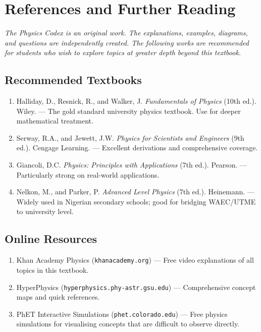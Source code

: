 
\chapter*{References and Further Reading}

{\small\itshape
The Physics Codex is an original work. The explanations,
examples, diagrams, and questions are independently created.
The following works are recommended for students who wish to
explore topics at greater depth beyond this textbook.
}

\vspace{0.5cm}

\section*{Recommended Textbooks}

\begin{enumerate}
  \item Halliday, D., Resnick, R., and Walker, J.
  \textit{Fundamentals of Physics} (10th ed.).
  Wiley. --- The gold standard university physics textbook.
  Use for deeper mathematical treatment.

  \item Serway, R.A., and Jewett, J.W.
  \textit{Physics for Scientists and Engineers} (9th ed.).
  Cengage Learning. --- Excellent derivations and
  comprehensive coverage.

  \item Giancoli, D.C.
  \textit{Physics: Principles with Applications} (7th ed.).
  Pearson. --- Particularly strong on real-world applications.

  \item Nelkon, M., and Parker, P.
  \textit{Advanced Level Physics} (7th ed.).
  Heinemann. --- Widely used in Nigerian secondary schools;
  good for bridging WAEC/UTME to university level.
\end{enumerate}

\section*{Online Resources}

\begin{enumerate}
  \item Khan Academy Physics (\texttt{khanacademy.org}) ---
  Free video explanations of all topics in this textbook.

  \item HyperPhysics (\texttt{hyperphysics.phy-astr.gsu.edu})
  --- Comprehensive concept maps and quick references.

  \item PhET Interactive Simulations
  (\texttt{phet.colorado.edu}) --- Free physics simulations
  for visualising concepts that are difficult to observe
  directly.
\end{enumerate}

